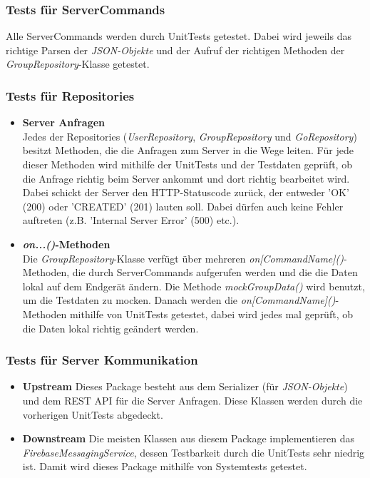 \documentclass[11pt,a4paper]{scrartcl}
\begin{document}
\subsubsection{Tests für ServerCommands}
Alle ServerCommands werden durch UnitTests getestet. Dabei wird jeweils das richtige Parsen der \textit{JSON-Objekte} und der Aufruf der richtigen Methoden der \textit{GroupRepository}-Klasse getestet.

\subsubsection{Tests für Repositories}
\begin{itemize}
	\item \textbf{Server Anfragen} \\ Jedes der Repositories (\textit{UserRepository}, \textit{GroupRepository} und \textit{GoRepository}) besitzt Methoden, die die Anfragen zum Server in die Wege leiten. Für jede dieser Methoden wird mithilfe der UnitTests und der Testdaten geprüft, ob die Anfrage richtig beim Server ankommt und dort richtig bearbeitet wird. Dabei schickt der Server den HTTP-Statuscode zurück, der entweder 'OK' (200) oder 'CREATED' (201) lauten soll. Dabei dürfen auch keine Fehler auftreten (z.B. 'Internal Server Error' (500) etc.).
	\item \textbf{\textit{on...()}-Methoden} \\ Die \textit{GroupRepository}-Klasse verfügt über mehreren \textit{on[CommandName]()}-Methoden, die durch ServerCommands aufgerufen werden und die die Daten lokal auf dem Endgerät ändern. Die Methode \textit{mockGroupData()} wird benutzt, um die Testdaten zu mocken. Danach werden die \textit{on[CommandName]()}-Methoden mithilfe von UnitTests getestet, dabei wird jedes mal geprüft, ob die Daten lokal richtig geändert werden.
\end{itemize}

\subsubsection{Tests für Server Kommunikation}
\begin{itemize}
	\item \textbf{Upstream} Dieses Package besteht aus dem Serializer (für \textit{JSON-Objekte}) und dem REST API für die Server Anfragen. Diese Klassen werden durch die vorherigen UnitTests abgedeckt.
	\item \textbf{Downstream} Die meisten Klassen aus diesem Package implementieren das \textit{FirebaseMessagingService}, dessen Testbarkeit durch die UnitTests sehr niedrig ist. Damit wird dieses Package mithilfe von Systemtests getestet.
\end{itemize}
\end{document}
